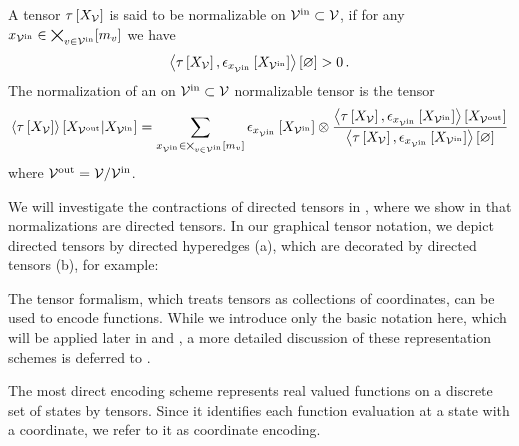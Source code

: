 \begin{definition}\label{def:normalization}
	A tensor $\tau\left[X_{\mathcal{V}}\right]$ is said to be normalizable on $\mathcal{V}^{\mathrm{in}}\subset\mathcal{V}$, if for any $x_{\mathcal{V}^{\mathrm{in}}}\in\bigtimes_{v\in\mathcal{V}^{\mathrm{in}}}[m_{v}]$ we have
	\begin{align*}
		 \left\langle \tau\left[X_{\mathcal{V}}\right],\epsilon_{x_{\mathcal{V}^{\mathrm{in}}}}\left[X_{\mathcal{V}^{\mathrm{in}}}\right]\right\rangle \left[ \varnothing \right] > 0 \, .
	\end{align*}
	The normalization of an on $\mathcal{V}^{\mathrm{in}}\subset\mathcal{V}$ normalizable tensor is the tensor
	\begin{align*}
		\left\langle \tau\left[X_{\mathcal{V}}\right]\right\rangle \left[ X_{\mathcal{V}^{\mathrm{out}}} | X_{\mathcal{V}^{\mathrm{in}}} \right] =
		\sum_{x_{\mathcal{V}^{\mathrm{in}}}\in\bigtimes_{v\in\mathcal{V}^{\mathrm{in}}}[m_{v}]}
		\epsilon_{x_{\mathcal{V}^{\mathrm{in}}}}\left[X_{\mathcal{V}^{\mathrm{in}}}\right] \otimes \frac{
		\left\langle \tau\left[X_{\mathcal{V}}\right],\epsilon_{x_{\mathcal{V}^{\mathrm{in}}}}\left[X_{\mathcal{V}^{\mathrm{in}}}\right]\right\rangle \left[ X_{\mathcal{V}^{\mathrm{out}}} \right]
		}{
		\left\langle \tau\left[X_{\mathcal{V}}\right],\epsilon_{x_{\mathcal{V}^{\mathrm{in}}}}\left[X_{\mathcal{V}^{\mathrm{in}}}\right]\right\rangle \left[ \varnothing \right]
		}
	\end{align*}
	where $\mathcal{V}^{\mathrm{out}} = \mathcal{V}/\mathcal{V}^{\mathrm{in}}$.
\end{definition}

We will investigate the contractions of directed tensors in , where we show in  that normalizations are directed tensors.
In our graphical tensor notation, we depict directed tensors by directed hyperedges (a), which are decorated by directed tensors (b), for example:
	\begin{center}
		
	\end{center}



\sect{\bnencoding}

The tensor formalism, which treats tensors as collections of coordinates, can be used to encode functions.
While we introduce only the basic notation here, which will be applied later in  and , a more detailed discussion of these representation schemes is deferred to .


The most direct encoding scheme represents real valued functions on a discrete set of states by tensors.
Since it identifies each function evaluation at a state with a coordinate, we refer to it as coordinate encoding.


